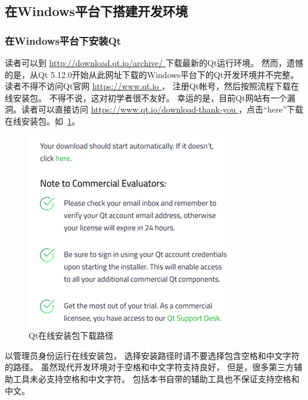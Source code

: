 ﻿




%

\FloatBarrier
\subsection{
在Windows平台下搭建开发环境
}\label{s000110}


\FloatBarrier
\subsubsection{
在Windows平台下安装Qt
}\label{ss000110}


读者可以到 \url{http://download.qt.io/archive/
}
下载最新的Qt运行环境。
然而，遗憾的是，从Qt 5.12.0开始从此网址下载的Windows平台下的Qt开发环境并不完整。
读者不得不访问Qt官网 \url{https://www.qt.io
}，
注册Qt帐号，然后按照流程下载在线安装包。
不得不说，这对初学者很不友好。
幸运的是，目前Qt网站有一个漏洞。读者可以直接访问
 \url{https://www.qt.io/download-thank-you
}，点击“here”下载在线安装包。如\figurename\ \ref{p000000}。
\begin{figure}[htb] %
\marginnote{\setlength\fboxsep{2pt}\fbox{\footnotesize{\kaishu\figurename\,}\footnotesize{\ref{p000000}}}}\centering %
\includegraphics[scale=0.95]{chapter01/images/windows_download_here.png} %
\caption{Qt在线安装包下载路径} %
\label{p000000} %
\end{figure}

以管理员身份运行在线安装包，
选择安装路径时请不要选择包含空格和中文字符的路径。
虽然现代开发环境对于空格和中文字符支持良好，
但是，很多第三方辅助工具未必支持空格和中文字符。
包括本书自带的辅助工具也不保证支持空格和中文。

